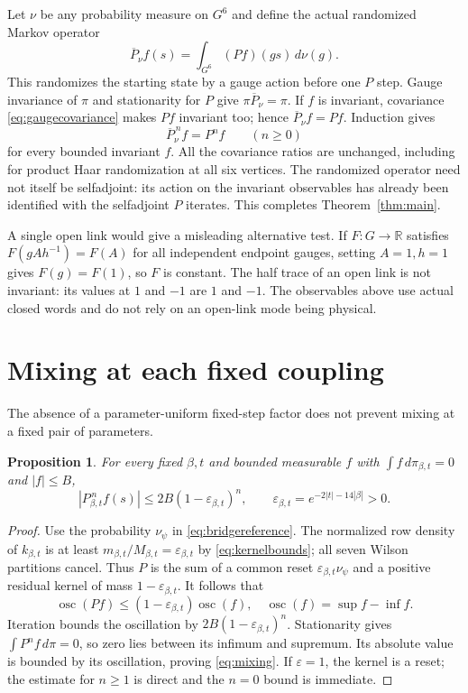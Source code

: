 \documentclass[11pt]{article}
\newtheorem{proposition}[theorem]{Proposition}
\newcommand{\R}{\mathbb R}\newcommand{\E}{\mathbb E}
\begin{document}
Let $\nu$ be any probability measure on $G^6$ and define the actual
randomized Markov operator
\begin{equation}\label{eq:gaugeaverage}
 \overline P_\nu f(s)=\int_{G^6}(Pf)(gs)\,d\nu(g).
\end{equation}
This randomizes the starting state by a gauge action before one $P$
step. Gauge invariance of $\pi$ and stationarity for $P$ give
$\pi\overline P_\nu=\pi$. If $f$ is invariant, covariance
\eqref{eq:gaugecovariance} makes $Pf$ invariant too; hence
$\overline P_\nu f=Pf$. Induction gives
\begin{equation}\label{eq:gaugeiterate}
 \overline P_\nu^{\,n}f=P^nf\qquad(n\geq0)
\end{equation}
for every bounded invariant $f$. All the covariance ratios are
unchanged, including for product Haar randomization at all six
vertices. The randomized operator need not itself be selfadjoint:
its action on the invariant observables has already been identified
with the selfadjoint $P$ iterates. This completes
Theorem~\ref{thm:main}.

A single open link would give a misleading alternative test. If
$F:G\to\R$ satisfies $F(gAh^{-1})=F(A)$ for all independent endpoint
gauges, setting $A=1,h=1$ gives $F(g)=F(1)$, so $F$ is constant.
The half trace of an open link is not invariant: its values at $1$
and $-1$ are $1$ and $-1$. The observables above use actual closed
words and do not rely on an open-link mode being physical.

\section{Mixing at each fixed coupling}
The absence of a parameter-uniform fixed-step factor does not prevent
mixing at a fixed pair of parameters.

\begin{proposition}\label{prop:mixing}
For every fixed $\beta,t$ and bounded measurable $f$ with
$\int f\,d\pi_{\beta,t}=0$ and $|f|\leq B$,
\begin{equation}\label{eq:mixing}
 |P_{\beta,t}^{\,n}f(s)|\leq2B(1-\varepsilon_{\beta,t})^n,
 \qquad\varepsilon_{\beta,t}=e^{-2|t|-14|\beta|}>0.
\end{equation}
\end{proposition}
\begin{proof}
Use the probability $\nu_\psi$ in \eqref{eq:bridgereference}.
The normalized row density of $k_{\beta,t}$ is at least
$m_{\beta,t}/M_{\beta,t}=\varepsilon_{\beta,t}$ by
\eqref{eq:kernelbounds}; all seven Wilson partitions cancel.
Thus $P$ is the sum of a common reset
$\varepsilon_{\beta,t}\nu_\psi$ and a positive residual kernel of
mass $1-\varepsilon_{\beta,t}$. It follows that
\[
 \operatorname{osc}(Pf)\leq
 (1-\varepsilon_{\beta,t})\operatorname{osc}(f),
 \quad \operatorname{osc}(f)=\sup f-\inf f.
\]
Iteration bounds the oscillation by $2B(1-\varepsilon_{\beta,t})^n$.
Stationarity gives $\int P^nf\,d\pi=0$, so zero lies between its
infimum and supremum. Its absolute value is bounded by its oscillation,
proving \eqref{eq:mixing}. If $\varepsilon=1$, the kernel is a reset;
the estimate for $n\geq1$ is direct and the $n=0$ bound is immediate.
\end{proof}
\end{document}
